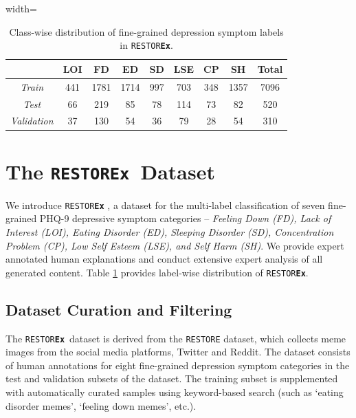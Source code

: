\documentclass[letterpaper]{article} %
\newcommand{\dataset}{\texttt{RESTOR\textbf{Ex}}}
\begin{document}
\begin{table}
    \caption{Class-wise distribution of fine-grained depression symptom labels in \dataset.}
    \label{tab:dataset}
\begin{adjustbox}{width=\columnwidth}
    \begin{tabular}{c | c c c c c c c | c}
    \toprule
      & LOI & FD & ED & SD & LSE & CP & SH &  Total\\
    \midrule
    \textit{Train} & 441 &  1781& 1714&997&703&348 &1357& 7096\\
    \textit{Test}& 66 &  219& 85&78&114&73 &82&520\\
    \textit{Validation} & 37 &130&54 &36& 79& 28&54& 310\\

    \bottomrule
    \end{tabular}
\end{adjustbox}
    
\end{table}



\section{The \dataset\ Dataset}
We introduce \dataset%
, a dataset for the multi-label classification of seven fine-grained PHQ-9 depressive symptom categories -- \textit{Feeling Down (FD), Lack of Interest (LOI), Eating Disorder (ED), Sleeping Disorder (SD), Concentration Problem (CP), Low Self Esteem (LSE), and Self Harm (SH)}. We provide expert annotated human explanations and conduct extensive expert analysis of all generated content. 
Table \ref{tab:dataset} provides label-wise distribution of \dataset.


\subsection{Dataset Curation and Filtering}
The \dataset\ dataset is derived from the \texttt{RESTORE} dataset, which collects meme images from the social media platforms, Twitter and Reddit. The dataset consists of human annotations for eight fine-grained depression symptom categories in the test and validation subsets of the dataset. The training subset is supplemented with automatically curated samples using keyword-based search (such as `eating disorder memes', `feeling down memes', etc.).
\end{document}

